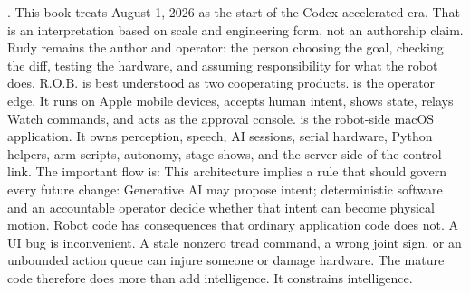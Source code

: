 {}.\markdownRendererParagraphSeparator
{}This book treats August 1, 2026 as the start of the Codex-accelerated era. That\markdownRendererSoftLineBreak
{}is an interpretation based on scale and engineering form, not an authorship\markdownRendererSoftLineBreak
{}claim. Rudy remains the author and operator: the person choosing the goal,\markdownRendererSoftLineBreak
{}checking the diff, testing the hardware, and assuming responsibility for what\markdownRendererSoftLineBreak
{}the robot does.\markdownRendererInterblockSeparator
{}\markdownRendererThematicBreak{}\markdownRendererInterblockSeparator
{}
\markdownRendererSectionEnd \markdownRendererSectionBegin
{}\markdownRendererInterblockSeparator
{}R.O.B. is best understood as two cooperating products.\markdownRendererParagraphSeparator
{} is the operator edge. It runs on Apple mobile devices, accepts\markdownRendererSoftLineBreak
{}human intent, shows state, relays Watch commands, and acts as the approval\markdownRendererSoftLineBreak
{}console.  is the robot-side macOS application. It owns perception,\markdownRendererSoftLineBreak
{}speech, AI sessions, serial hardware, Python helpers, arm scripts, autonomy,\markdownRendererSoftLineBreak
{}stage shows, and the server side of the control link.\markdownRendererParagraphSeparator
{}The important flow is:\markdownRendererInterblockSeparator
{}\markdownRendererInterblockSeparator
{}This architecture implies a rule that should govern every future change:\markdownRendererInterblockSeparator
{}\markdownRendererBlockQuoteBegin
Generative AI may propose intent; deterministic software and an accountable\markdownRendererSoftLineBreak
{}operator decide whether that intent can become physical motion.\markdownRendererBlockQuoteEnd \markdownRendererInterblockSeparator
{}Robot code has consequences that ordinary application code does not. A UI bug\markdownRendererSoftLineBreak
{}is inconvenient. A stale nonzero tread command, a wrong joint sign, or an\markdownRendererSoftLineBreak
{}unbounded action queue can injure someone or damage hardware. The mature code\markdownRendererSoftLineBreak
{}therefore does more than add intelligence. It constrains intelligence.\markdownRendererInterblockSeparator
{}\markdownRendererThematicBreak{}\markdownRendererInterblockSeparator
